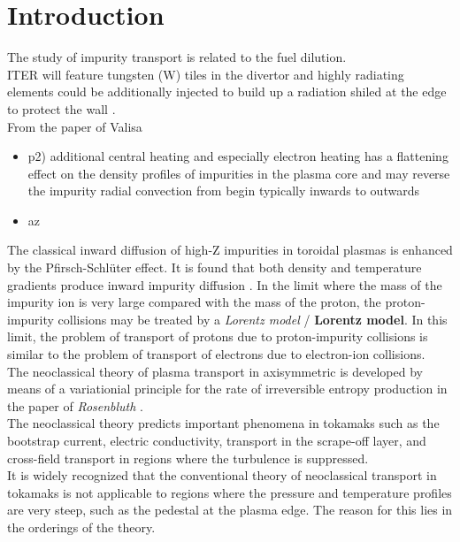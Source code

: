 \chapter{Introduction}
\minitoc
The study of impurity transport is related to the fuel dilution. \\
ITER will feature tungsten (W) tiles in the divertor and highly radiating elements could be additionally injected to build up a radiation shiled at the edge to protect the wall \cite{Valisa}. \\
From the paper of Valisa \cite{Valisa}
\begin{itemize}
    \item p2) additional central heating and especially electron heating has a flattening effect on the density profiles of impurities in the plasma core and may reverse the impurity radial convection from begin typically inwards to outwards
    \item   az
\end{itemize}


The classical inward diffusion of high-Z impurities in toroidal plasmas is enhanced by the Pfirsch-Schlüter effect. It is found that both density and temperature gradients produce inward impurity diffusion \cite{Rutherford}. In the limit where the mass of the impurity ion is very large compared with the mass of the proton, the proton-impurity collisions may be treated by a \emph{Lorentz model} / {\bf{Lorentz model}}. In this limit, the problem of transport of protons due to proton-impurity collisions is similar to the problem of transport of electrons due to electron-ion collisions. \\

The neoclassical theory of plasma transport in axisymmetric is developed by means of a variationial principle for the rate of irreversible entropy production in the paper of \emph{Rosenbluth} \cite{Rosenbluth}. \\

The neoclassical theory predicts important phenomena in tokamaks such as the bootstrap current, electric conductivity, transport in the scrape-off layer, and cross-field transport in regions where the turbulence is suppressed. \\

It is widely recognized that the conventional theory of neoclassical transport in tokamaks is not applicable to regions where the pressure and temperature profiles are very steep, such as the pedestal at the plasma edge. The reason for this lies in the orderings of the theory. 


